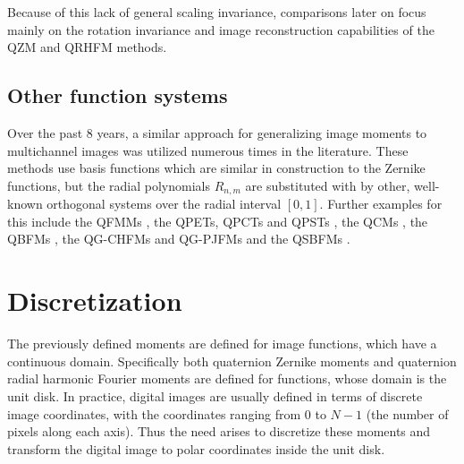 Because of this lack of general scaling invariance, comparisons later on focus mainly on the rotation invariance and image reconstruction capabilities of the QZM and QRHFM methods.


\subsection{Other function systems}
Over the past 8 years, a similar approach for generalizing image moments to multichannel images was utilized numerous times in the literature. These methods use basis functions which are similar in construction to the Zernike functions, but the radial polynomials $R_{n,m}$ are substituted with by other, well-known orthogonal systems over the radial interval $[0,1]$. Further examples for this include the QFMMs \cite{qfmm}, the QPETs, QPCTs and QPSTs \cite{Li}, the QCMs \cite{Guo}, the QBFMs \cite{Shao}, the QG-CHFMs and QG-PJFMs \cite{Singh} and the QSBFMs \cite{Yang}.


\section{Discretization}\label{sec:discretization}
The previously defined moments are defined for image functions, which have a continuous domain. Specifically both quaternion Zernike moments and quaternion radial harmonic Fourier moments are defined for functions, whose domain is the unit disk. In practice, digital images are usually defined in terms of discrete image coordinates, with the coordinates ranging from $0$ to $N-1$ (the number of pixels along each axis). Thus the need arises to discretize these moments and transform the digital image to polar coordinates inside the unit disk.


